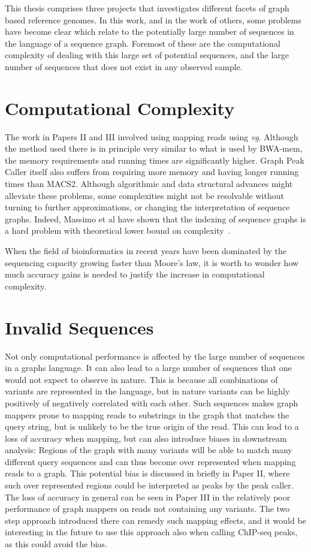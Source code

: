 This thesis comprises three projects that investigates different facets of graph based reference genomes.
In this work, and in the work of others, some problems have become clear which relate to the potentially large number of sequences in the language of a sequence graph. Foremost of these are the computational complexity of dealing with this large set of potential sequences, and the large number of sequences that does not exist in any observed sample.

\section{Computational Complexity}
The work in Papers II and III involved using mapping reads using \emph{vg}.
Although the method used there is in principle very similar to what is used by BWA-mem, the memory requirements and running times are significantly higher.
Graph Peak Caller itself also suffers from requiring more memory and having longer running times than MACS2. 
Although algorithmic and data structural advances might alleviate these problems, some complexities might not be resolvable without turning to further approximations, or changing the interpretation of sequence graphs.
Indeed, Massimo et al have shown that the indexing of sequence graphs is a hard problem with theoretical lower bound on complexity~\cite{indexcomplexity}.

When the field of bioinformatics in recent years have been dominated by the sequencing capacity growing faster than Moore's law, it is worth to wonder how much accuracy gains is needed to justify the increase in computational complexity.

\section{Invalid Sequences}
Not only computational performance is affected by the large number of sequences in a graphs language.
It can also lead to a large number of sequences that one would not expect to observe in nature.
This is because all combinations of variants are represented in the language, but in nature variants can be highly positively of negatively correlated with each other.
Such sequences makes graph mappers prone to mapping reads to substrings in the graph that matches the query string, but is unlikely to be the true origin of the read.
This can lead to a loss of accuracy when mapping, but can also introduce biases in downstream analysis: Regions of the graph with many variants will be able to match many different query sequences and can thus become over represented when mapping reads to a graph.
This potential bias is discussed in briefly in Paper II, where such over represented regions could be interpreted as peaks by the peak caller.
The loss of accuracy in general can be seen in Paper III in the relatively poor performance of graph mappers on reads not containing any variants.
The two step approach introduced there can remedy such mapping effects, and it would be interesting in the future to use this approach also when calling ChIP-seq peaks, as this could avoid the bias.

